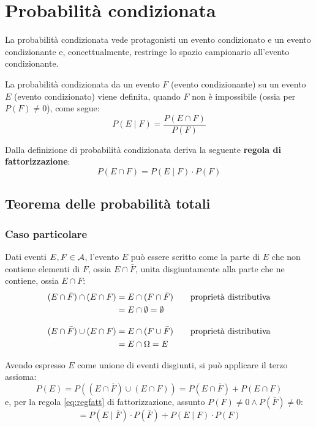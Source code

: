 \section{Probabilità condizionata}
La probabilità condizionata vede protagonisti un evento condizionato e un evento condizionante e, concettualmente, restringe lo spazio campionario all'evento condizionante.

\begin{defin}
	La probabilità condizionata da un evento $F$ (evento condizionante) su un evento $E$ (evento condizionato) viene definita, quando $F$ non è impossibile (ossia per $P(F)\neq 0$), come segue:
	\begin{equation*}
		P(E\mid F)=\frac{P(E \cap F)}{P(F)}
	\end{equation*}
\end{defin}

Dalla definizione di probabilità condizionata deriva la seguente \textbf{regola di fattorizzazione}:
\begin{equation} \label{eq:regfatt}
	P(E \cap F)=P(E\mid F)\cdot P(F)
\end{equation}



\subsection{Teorema delle probabilità totali}

\subsubsection{Caso particolare}
Dati eventi $E, F\in \mathcal A$, l'evento $E$ può essere scritto come la parte di $E$ che non contiene elementi di $F$, ossia $E\cap \bar F$, unita disgiuntamente alla parte che ne contiene, ossia $E \cap F$:
\begin{align*}
	(E \cap \bar F) \cap (E \cap F) & = E \cap (F \cap \bar F)& \quad & \text{proprietà distributiva}  \\
	                                & = E \cap \emptyset = \emptyset                       \\[2ex]
	(E \cap \bar F) \cup (E \cap F) & = E \cap (F \cup \bar F) & \quad & \text{proprietà distributiva} \\
	                                & = E \cap \Omega = E
\end{align*}

Avendo espresso $E$ come unione di eventi disgiunti, si può applicare il terzo assioma:
\begin{equation*}
	P(E) = P((E \cap \bar F)\cup(E \cap F)) = P(E \cap \bar F)+P(E \cap F)
\end{equation*}
e, per la regola \eqref{eq:regfatt} di fattorizzazione, assunto $P(F)\neq 0 \land P(\bar F)\neq 0$:
\begin{equation*}
	=P(E\mid \bar F)\cdot P(\bar F) + P(E \mid F)\cdot P(F)
\end{equation*}


